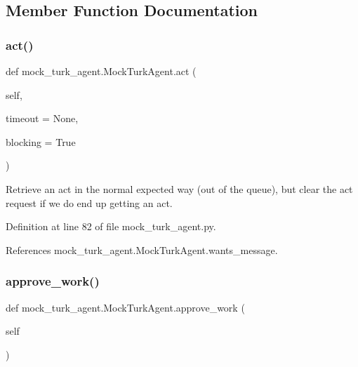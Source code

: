 \subsection{Member Function Documentation}
\mbox{\label{classmock__turk__agent_1_1MockTurkAgent_ab13b462e5ae6d55f19f180b3f9006acd}} 
\subsubsection{\texorpdfstring{act()}{act()}}
{\footnotesize\ttfamily def mock\+\_\+turk\+\_\+agent.\+Mock\+Turk\+Agent.\+act (\begin{DoxyParamCaption}\item[{}]{self,  }\item[{}]{timeout = {\ttfamily None},  }\item[{}]{blocking = {\ttfamily True} }\end{DoxyParamCaption})}

\begin{DoxyVerb}Retrieve an act in the normal expected way (out of the queue), but
clear the act request if we do end up getting an act.\end{DoxyVerb}
 

Definition at line 82 of file mock\+\_\+turk\+\_\+agent.\+py.



References mock\+\_\+turk\+\_\+agent.\+Mock\+Turk\+Agent.\+wants\+\_\+message.

\mbox{\label{classmock__turk__agent_1_1MockTurkAgent_acad647ecc28187f9c2ac6c0da14fcdfb}} 
\subsubsection{\texorpdfstring{approve\+\_\+work()}{approve\_work()}}
{\footnotesize\ttfamily def mock\+\_\+turk\+\_\+agent.\+Mock\+Turk\+Agent.\+approve\+\_\+work (\begin{DoxyParamCaption}\item[{}]{self }\end{DoxyParamCaption})}



